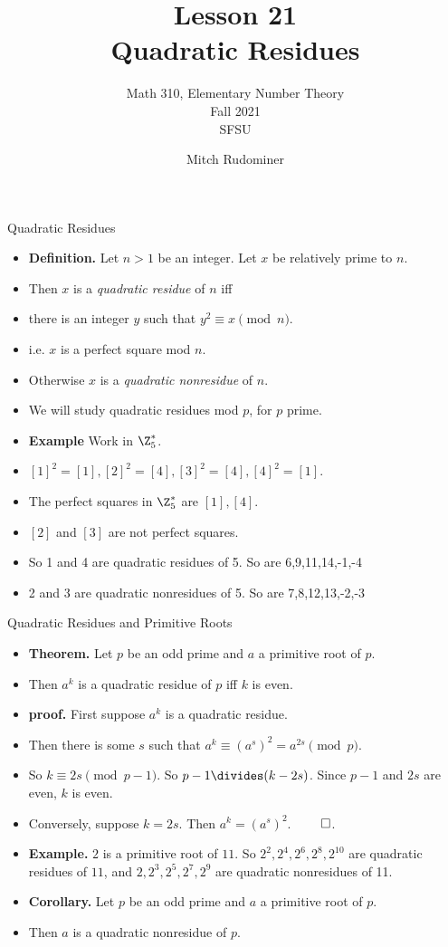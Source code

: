 \documentclass[handout]{beamer}
\title{Lesson 21 \\ Quadratic Residues}
\subtitle{Math 310, Elementary Number Theory \\ Fall 2021 \\ SFSU}
\author{Mitch Rudominer}
\date{}
\begin{document}
\begin{frame}
  \titlepage
\end{frame}

\begin{frame}{Quadratic Residues}

\begin{itemize}
  \item \textbf{Definition.} Let $n>1$ be an integer. Let $x$ be relatively prime to $n$.
  \item Then $x$ is a \emph{quadratic residue} of $n$ iff
  \item there is an integer $y$ such that $y^2 \equiv x \pmod n$.
  \item i.e. $x$ is a perfect square mod $n$.
  \item Otherwise $x$ is a \emph{quadratic nonresidue} of $n$.
  \item We will study quadratic residues mod $p$, for $p$ prime.
  \item \textbf{Example} Work in $\Z^*_5$.
  \item $[1]^2 = [1], [2]^2 = [4], [3]^2 = [4], [4]^2 = [1]$.
  \item The perfect squares in $\Z^*_5$ are $[1], [4]$.
  \item $[2]$ and $[3]$ are not perfect squares.
  \item So 1 and 4 are quadratic residues of 5. So are 6,9,11,14,-1,-4
  \item 2 and 3 are quadratic nonresidues of 5. So are 7,8,12,13,-2,-3
\end{itemize}

\end{frame}

\begin{frame}{Quadratic Residues and Primitive Roots}

\begin{itemize}
  \item \textbf{Theorem.} Let $p$ be an odd prime and $a$ a primitive root of $p$.
  \item Then $a^k$ is a quadratic residue of $p$ iff $k$ is even.
  \item \textbf{proof.} First suppose $a^k$ is a quadratic residue.
  \item Then there is some $s$ such that $a^k \equiv (a^s)^2 = a^{2s} \pmod p$.
  \item So $k\equiv 2s \pmod {p-1}$. So $p-1 \divides (k-2s)$. Since $p-1$ and $2s$ are even, $k$ is even.
  \item Conversely, suppose $k=2s$. Then $a^k = (a^s)^2$. $\qed$.
  \item \textbf{Example.} $2$ is a primitive root of $11$. So $2^2, 2^4, 2^6, 2^8, 2^{10}$ are quadratic
  residues of $11$, and $2, 2^3, 2^5, 2^7, 2^9$ are quadratic nonresidues of 11.
  \item \textbf{Corollary.} Let $p$ be an odd prime and $a$ a primitive root of $p$.
  \item Then $a$ is a quadratic nonresidue of $p$.
\end{itemize}

\end{frame}
\end{document}
